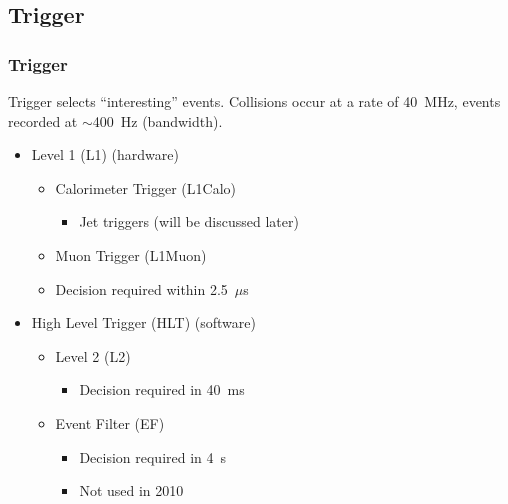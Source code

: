 \documentclass[10pt]{beamer}
\begin{document}
\begin{frame}
\subsection{Trigger}
\frametitle{Trigger} 
Trigger selects ``interesting'' events. Collisions occur at a rate of 40~MHz, events recorded at $\sim$400~Hz (bandwidth).
\begin{itemize}
\item Level 1 (L1) (hardware)
\begin{itemize}
\item Calorimeter Trigger (L1Calo)
\begin{itemize}
\item Jet triggers (will be discussed later)
\end{itemize}
\item Muon Trigger (L1Muon)
\item Decision required within 2.5~$\mu$s
\end{itemize}
\item High Level Trigger (HLT) (software)
\begin{itemize}
\item Level 2 (L2)
\begin{itemize}
\item Decision required in 40~ms
\end{itemize}
\item Event Filter (EF) 
\begin{itemize}
\item Decision required in 4~s
\item Not used in 2010
\end{itemize}
\end{itemize}
\end{itemize}

\end{frame}
\end{document}
